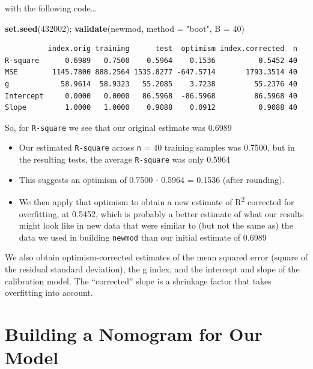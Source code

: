 \documentclass[]{book}
\newenvironment{Shaded}{\begin{snugshade}}{\end{snugshade}}
\newcommand{\KeywordTok}[1]{\textcolor[rgb]{0.13,0.29,0.53}{\textbf{#1}}}
\newcommand{\DataTypeTok}[1]{\textcolor[rgb]{0.13,0.29,0.53}{#1}}
\newcommand{\DecValTok}[1]{\textcolor[rgb]{0.00,0.00,0.81}{#1}}
\newcommand{\StringTok}[1]{\textcolor[rgb]{0.31,0.60,0.02}{#1}}
\newcommand{\NormalTok}[1]{#1}
\providecommand{\tightlist}{%
  \setlength{\itemsep}{0pt}\setlength{\parskip}{0pt}}
\theoremstyle{definition}
\theoremstyle{definition}
\theoremstyle{definition}
\theoremstyle{remark}
\begin{document}
with the following code\ldots{}

\begin{Shaded}
\begin{Highlighting}[]
\KeywordTok{set.seed}\NormalTok{(}\DecValTok{432002}\NormalTok{); }\KeywordTok{validate}\NormalTok{(newmod, }\DataTypeTok{method =} \StringTok{"boot"}\NormalTok{, }\DataTypeTok{B =} \DecValTok{40}\NormalTok{)}
\end{Highlighting}
\end{Shaded}

\begin{verbatim}
          index.orig training      test  optimism index.corrected  n
R-square      0.6989   0.7500    0.5964    0.1536          0.5452 40
MSE        1145.7800 888.2564 1535.8277 -647.5714       1793.3514 40
g            58.9614  58.9323   55.2085    3.7238         55.2376 40
Intercept     0.0000   0.0000   86.5968  -86.5968         86.5968 40
Slope         1.0000   1.0000    0.9088    0.0912          0.9088 40
\end{verbatim}

So, for \texttt{R-square} we see that our original estimate was 0.6989

\begin{itemize}
\tightlist
\item
  Our estimated \texttt{R-square} across \texttt{n} = 40 training
  samples was 0.7500, but in the resulting tests, the average
  \texttt{R-square} was only 0.5964
\item
  This suggests an optimism of 0.7500 - 0.5964 = 0.1536 (after
  rounding).
\item
  We then apply that optimism to obtain a new estimate of
  R\textsuperscript{2} corrected for overfitting, at 0.5452, which is
  probably a better estimate of what our results might look like in new
  data that were similar to (but not the same as) the data we used in
  building \texttt{newmod} than our initial estimate of 0.6989
\end{itemize}

We also obtain optimism-corrected estimates of the mean squared error
(square of the residual standard deviation), the g index, and the
intercept and slope of the calibration model. The ``corrected'' slope is
a shrinkage factor that takes overfitting into account.

\section{Building a Nomogram for Our
Model}\label{building-a-nomogram-for-our-model}
\end{document}
